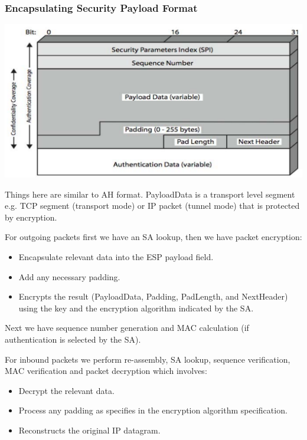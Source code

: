 \documentclass{article}
\begin{document}
\subsubsection{Encapsulating Security Payload Format}
\begin{center}
  \includegraphics[scale=0.6]{esp-format.png}
\end{center}
Things here are similar to AH format. PayloadData is a transport level segment e.g. TCP segment (transport mode) or IP packet (tunnel mode) that is protected by encryption.

For outgoing packets first we have an SA lookup, then we have packet encryption:
\begin{itemize}
  \item Encapsulate relevant data into the ESP payload field.
  \item Add any necessary padding.
  \item Encrypts the result (PayloadData, Padding, PadLength, and NextHeader) using the key and the encryption algorithm  indicated by the SA.
\end{itemize}
Next we have sequence number generation and MAC calculation (if authentication is selected by the SA).

For inbound packets we perform re-assembly, SA lookup, sequence verification, MAC verification and packet decryption which involves:
\begin{itemize}
  \item Decrypt the relevant data.
  \item Process any padding as specifies in the encryption algorithm specification.
  \item Reconstructs the original IP datagram.
\end{itemize}
\end{document}
